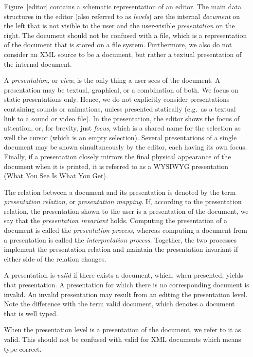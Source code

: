 \documentclass{speauth}
\begin{document}
Figure~\ref{editor} contains a schematic representation of an editor. The main data structures in the editor (also referred to as {\em levels}) are the internal {\em document} on the left that is not visible to the user and the user-visible {\em presentation} on the right. The document should not be confused with a file, which is a representation of the document that is stored on a file system. Furthermore, we also do not consider an XML source to be a document, but rather a textual presentation of the internal document.


A {\em presentation}, or {\em view}, is the only thing a user sees of the document. A presentation may be textual, graphical, or a combination of both. We focus on static presentations only. Hence, we do not explicitly consider presentations containing sounds or animations, unless presented statically (e.g.\ as a textual link to a sound or video file). In the presentation, the editor shows the focus of attention, or, for brevity, just {\em focus}, which is a shared name for the selection as well the cursor (which is an empty selection).  Several presentations of a single document may be shown simultaneously by the editor, each having its own focus. Finally, if a presentation closely mirrors the final physical appearance of the document when it is printed, it is referred to as a WYSIWYG presentation (What You See Is What You Get).

The relation between a document and its presentation is denoted by the term {\em presentation relation}, or {\em presentation mapping}. If, according to the presentation relation, the presentation shown to the user is a presentation of the document, we say that the {\em presentation invariant} holds. Computing the presentation of a document is called the {\em presentation process}, whereas computing a document from a presentation is called the {\em interpretation process}. Together, the two processes implement the presentation relation and maintain the presentation invariant if either side of the relation changes.

A presentation is {\em valid} if there exists a document, which, when presented, yields that presentation. A presentation for which there is no corresponding document is invalid. An invalid presentation may result from an editing the presentation level. Note the difference with the term valid document, which denotes a document that is well typed.

\bc

When the presentation level is a presentation of the document, we refer to it as valid. This should not be confused with valid for XML documents which means type correct.
\end{document}
